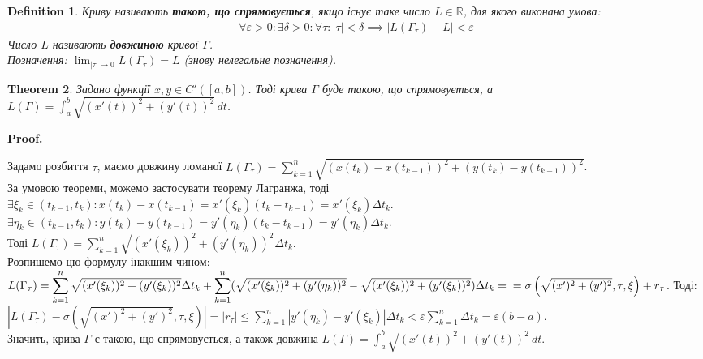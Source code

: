 \documentclass[a4paper, 10pt]{article}
\makeatletter
\def\huge{\displaystyle}
\def\qed{$\blacksquare$}
\theoremstyle{theoremdd}
\newtheorem{theorem}{Theorem}[subsection]
\theoremstyle{theoremdd}
\theoremstyle{theoremdd}
\newtheorem{definition}[theorem]{Definition}
\theoremstyle{theoremdd}
\theoremstyle{theoremdd}
\theoremstyle{theoremdd}
\theoremstyle{theoremdd}
\theoremstyle{theoremdd}
\theoremstyle{theoremdd}
\renewenvironment{proof}[1][Proof.\\]{\par
\pushQED{\hfill \qed}%
\normalfont \topsep6\p@\@plus6\p@\relax
\trivlist
\item\relax
{\bfseries
#1\@addpunct{.}}\hspace\labelsep\ignorespaces
}{%
\popQED\endtrivlist\@endpefalse
}
\makeatother
\begin{document}
\begin{definition}
Криву називають \textbf{такою, що спрямовується}, якщо існує таке число $L \in \mathbb{R}$, для якого виконана умова:
\begin{align*}
\forall \varepsilon > 0: \exists \delta > 0: \forall \tau: |\tau| < \delta \implies |L(\Gamma_\tau) -L| < \varepsilon
\end{align*}
Число $L$ називають \textbf{довжиною} кривої $\Gamma$.\\
Позначення: $\huge\lim_{|\tau| \to 0} L(\Gamma_\tau) = L$ (знову нелегальне позначення).
\end{definition}

\begin{theorem}
Задано функції $x,y \in C'([a,b])$. Тоді крива $\Gamma$ буде такою, що спрямовується, а $L(\Gamma) = \huge\int_a^b \sqrt{(x'(t))^2 + (y'(t))^2}\,dt$.
\end{theorem}

\begin{proof}
Задамо розбиття $\tau$, маємо довжину ломаної $L(\Gamma_{\tau}) = \huge\sum_{k=1}^n \sqrt{(x(t_{k})-x(t_{k-1}))^2 + (y(t_{k})-y(t_{k-1}))^2}$.\\
За умовою теореми, можемо застосувати теорему Лагранжа, тоді\\
$\exists \xi_k \in (t_{k-1},t_k): x(t_{k})-x(t_{k-1}) = x'(\xi_k) (t_{k}-t_{k-1}) = x'(\xi_k) \Delta t_k$.\\
$\exists \eta_k \in (t_{k-1},t_k): y(t_{k})-y(t_{k-1}) = y'(\eta_k) (t_k-t_{k-1}) = y'(\eta_k) \Delta t_k$.\\
Тоді $L(\Gamma_\tau) = \huge\sum_{k=1}^n \sqrt{(x'(\xi_k))^2 + (y'(\eta_k))^2} \Delta t_k$.\\
Розпишемо цю формулу інакшим чином:\\
$L(\Gamma_\tau) = \huge\sum_{k=1}^n \sqrt{(x'(\xi_k))^2 + (y'(\xi_k))^2} \Delta t_k + \huge\sum_{k=1}^n (\sqrt{(x'(\xi_k))^2 + (y'(\eta_k))^2} - \sqrt{(x'(\xi_k))^2 + (y'(\xi_k))^2}) \Delta t_k = \\ = \sigma \left(\sqrt{(x')^2+(y')^2}, \tau, \xi \right) + r_\tau$. Тоді:\\
$|L(\Gamma_\tau) - \sigma \left(\sqrt{(x')^2+(y')^2}, \tau, \xi \right)| = |r_\tau| \leq \huge\sum_{k=1}^n |y'(\eta_k) - y'(\xi_k)| \Delta t_k < \varepsilon \huge\sum_{k=1}^n \Delta t_k = \varepsilon (b-a)$.\\
Значить, крива $\Gamma$ є такою, що спрямовується, а також довжина
$L(\Gamma) = \huge\int_a^b \sqrt{(x'(t))^2 + (y'(t))^2}\,dt$.
\end{proof}
\end{document}
